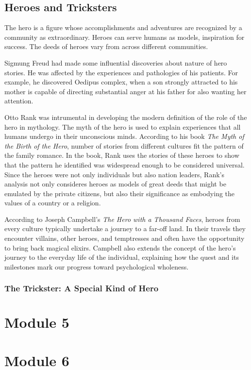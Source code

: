 \documentclass{article}
\begin{document}
\subsection{Heroes and Tricksters}

The hero is a figure whose accomplishments and adventures are recognized by a community as extraordinary. Heroes can serve humans as models, inspiration for success. The deeds of heroes vary from across different communities.

Sigmung Freud had made some influential discoveries about nature of hero stories. He was affected by the experiences and pathologies of his patients. For example, he discovered Oedipus complex, when a son strongly attracted to his mother is capable of directing substantial anger at his father for also wanting her attention.

Otto Rank was intrumental in developing the modern definition of the role of the hero in mythology. The myth of the hero is used to explain experiences that all humans undergo in their unconscious minds. According to his book \textit{The Myth of the Birth of the Hero}, number of stories from different cultures fit the pattern of the family romance. In the book, Rank uses the stories of these heroes to show that the pattern he identified was widespread enough to be considered universal. Since the heroes were not only individuals but also nation leaders, Rank's analysis not only consideres heroes as models of great deeds that might be emulated by the private citizens, but also their significance as embodying the values of a country or a religion.

According to Joseph Campbell's \textit{The Hero with a Thousand Faces}, heroes from every culture typically undertake a journey to a far-off land. In their travels they encounter villains, other heroes, and temptresses and often have the opportunity to bring back magical elixirs. Campbell also extends the concept of the hero's journey to the everyday life of the individual, explaining how the quest and its milestones mark our progress toward psychological wholeness.

\subsubsection{The Trickster: A Special Kind of Hero}

\section{Module 5}
\section{Module 6}
\end{document}

